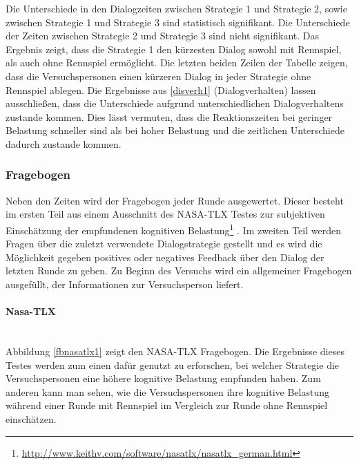 \documentclass[12pt,a4paper]{scrartcl}
\begin{document}
Die Unterschiede in den Dialogzeiten zwischen Strategie 1 und Strategie 2, sowie zwischen Strategie 1 und Strategie 3 sind statistisch signifikant. Die Unterschiede der Zeiten zwischen Strategie 2 und Strategie 3 sind nicht signifikant. Das Ergebnis zeigt, dass die Strategie 1 den kürzesten Dialog sowohl mit Rennspiel, als auch ohne Rennspiel ermöglicht. Die letzten beiden Zeilen der Tabelle zeigen, dass die Versuchspersonen einen kürzeren Dialog in jeder Strategie ohne Rennspiel ablegen. Die Ergebnisse aus \ref{disverh1} (Dialogverhalten) lassen ausschließen, dass die Unterschiede aufgrund unterschiedlichen Dialogverhaltens zustande kommen. Dies lässt vermuten, dass die Reaktionszeiten bei geringer Belastung schneller sind als bei hoher Belastung und die zeitlichen Unterschiede dadurch zustande kommen. 
\subsubsection{Fragebogen}
\label{fragebogen1}
Neben den Zeiten wird der Fragebogen jeder Runde ausgewertet. Dieser besteht im ersten Teil aus einem Ausschnitt des NASA-TLX Testes zur subjektiven Einschätzung der empfundenen kognitiven Belastung\footnote{\label{foot:nasatlx1}\url{http://www.keithv.com/software/nasatlx/nasatlx_german.html}} . Im zweiten Teil werden Fragen über die zuletzt verwendete Dialogstrategie gestellt und es wird die Möglichkeit gegeben positives oder negatives Feedback über den Dialog der letzten Runde zu geben. Zu Beginn des Versuchs wird ein allgemeiner Fragebogen ausgefüllt, der Informationen zur Versuchsperson liefert. 
\paragraph{Nasa-TLX}
~\\
Abbildung \ref{fbnasatlx1} zeigt den NASA-TLX Fragebogen. 
Die Ergebnisse dieses Testes werden zum einen dafür genutzt zu erforschen, bei welcher Strategie die Versuchspersonen eine höhere kognitive Belastung empfunden haben. Zum anderen kann man sehen, wie die Versuchspersonen ihre kognitive Belastung während einer Runde mit Rennspiel im Vergleich zur Runde ohne Rennspiel einschätzen. 
\end{document}
